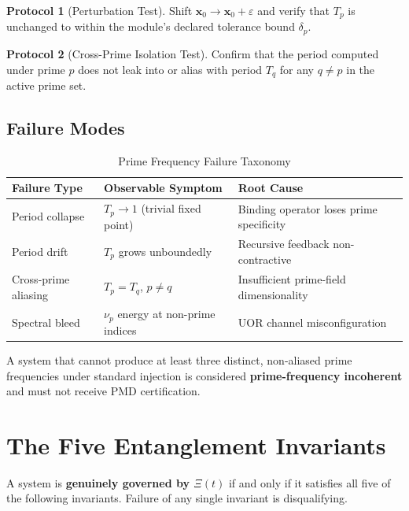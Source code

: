 \documentclass[12pt,letterpaper]{article}
\theoremstyle{definition}
\newtheorem{protocol}{Protocol}[section]
\theoremstyle{remark}
\begin{document}
\begin{protocol}[Perturbation Test]
Shift $\mathbf{x}_0 \to \mathbf{x}_0 + \varepsilon$ and verify that $T_p$ is unchanged to within the module's declared tolerance bound $\delta_p$.
\end{protocol}

\begin{protocol}[Cross-Prime Isolation Test]
Confirm that the period computed under prime $p$ does not leak into or alias with period $T_q$ for any $q \neq p$ in the active prime set.
\end{protocol}

\subsection{Failure Modes}

\begin{table}[H]
\centering
\caption{Prime Frequency Failure Taxonomy}
\begin{tabular}{lll}
\toprule
\textbf{Failure Type} & \textbf{Observable Symptom} & \textbf{Root Cause} \\
\midrule
Period collapse & $T_p \to 1$ (trivial fixed point) & Binding operator loses prime specificity \\
Period drift & $T_p$ grows unboundedly & Recursive feedback non-contractive \\
Cross-prime aliasing & $T_p = T_q$, $p \neq q$ & Insufficient prime-field dimensionality \\
Spectral bleed & $\nu_p$ energy at non-prime indices & UOR channel misconfiguration \\
\bottomrule
\end{tabular}
\end{table}

A system that cannot produce at least three distinct, non-aliased prime frequencies under standard injection is considered \textbf{prime-frequency incoherent} and must not receive PMD certification.

\section{The Five Entanglement Invariants}

A system is \textbf{genuinely governed by $\Xi(t)$} if and only if it satisfies all five of the following invariants. Failure of any single invariant is disqualifying.
\end{document}

